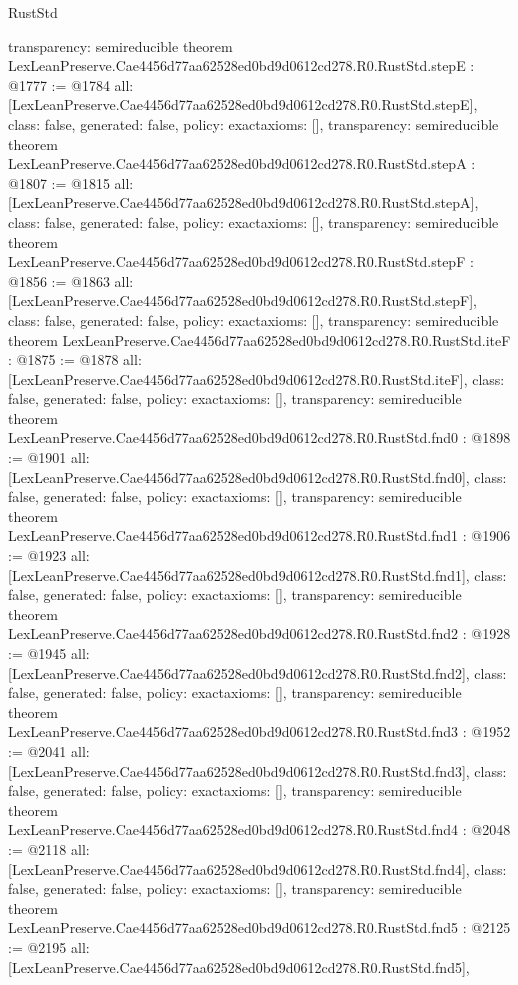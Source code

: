 \begin{lexlean}{RustStd}
\begin{coremodule}
{  transparency: semireducible
}
theorem LexLeanPreserve.Cae4456d77aa62528ed0bd9d0612cd278.R0.RustStd.stepE : @1777 := @1784 {
  all: [LexLeanPreserve.Cae4456d77aa62528ed0bd9d0612cd278.R0.RustStd.stepE],
  class: false,
  generated: false,
  policy: exact{axioms: []},
  transparency: semireducible
}
theorem LexLeanPreserve.Cae4456d77aa62528ed0bd9d0612cd278.R0.RustStd.stepA : @1807 := @1815 {
  all: [LexLeanPreserve.Cae4456d77aa62528ed0bd9d0612cd278.R0.RustStd.stepA],
  class: false,
  generated: false,
  policy: exact{axioms: []},
  transparency: semireducible
}
theorem LexLeanPreserve.Cae4456d77aa62528ed0bd9d0612cd278.R0.RustStd.stepF : @1856 := @1863 {
  all: [LexLeanPreserve.Cae4456d77aa62528ed0bd9d0612cd278.R0.RustStd.stepF],
  class: false,
  generated: false,
  policy: exact{axioms: []},
  transparency: semireducible
}
theorem LexLeanPreserve.Cae4456d77aa62528ed0bd9d0612cd278.R0.RustStd.iteF : @1875 := @1878 {
  all: [LexLeanPreserve.Cae4456d77aa62528ed0bd9d0612cd278.R0.RustStd.iteF],
  class: false,
  generated: false,
  policy: exact{axioms: []},
  transparency: semireducible
}
theorem LexLeanPreserve.Cae4456d77aa62528ed0bd9d0612cd278.R0.RustStd.fnd0 : @1898 := @1901 {
  all: [LexLeanPreserve.Cae4456d77aa62528ed0bd9d0612cd278.R0.RustStd.fnd0],
  class: false,
  generated: false,
  policy: exact{axioms: []},
  transparency: semireducible
}
theorem LexLeanPreserve.Cae4456d77aa62528ed0bd9d0612cd278.R0.RustStd.fnd1 : @1906 := @1923 {
  all: [LexLeanPreserve.Cae4456d77aa62528ed0bd9d0612cd278.R0.RustStd.fnd1],
  class: false,
  generated: false,
  policy: exact{axioms: []},
  transparency: semireducible
}
theorem LexLeanPreserve.Cae4456d77aa62528ed0bd9d0612cd278.R0.RustStd.fnd2 : @1928 := @1945 {
  all: [LexLeanPreserve.Cae4456d77aa62528ed0bd9d0612cd278.R0.RustStd.fnd2],
  class: false,
  generated: false,
  policy: exact{axioms: []},
  transparency: semireducible
}
theorem LexLeanPreserve.Cae4456d77aa62528ed0bd9d0612cd278.R0.RustStd.fnd3 : @1952 := @2041 {
  all: [LexLeanPreserve.Cae4456d77aa62528ed0bd9d0612cd278.R0.RustStd.fnd3],
  class: false,
  generated: false,
  policy: exact{axioms: []},
  transparency: semireducible
}
theorem LexLeanPreserve.Cae4456d77aa62528ed0bd9d0612cd278.R0.RustStd.fnd4 : @2048 := @2118 {
  all: [LexLeanPreserve.Cae4456d77aa62528ed0bd9d0612cd278.R0.RustStd.fnd4],
  class: false,
  generated: false,
  policy: exact{axioms: []},
  transparency: semireducible
}
theorem LexLeanPreserve.Cae4456d77aa62528ed0bd9d0612cd278.R0.RustStd.fnd5 : @2125 := @2195 {
  all: [LexLeanPreserve.Cae4456d77aa62528ed0bd9d0612cd278.R0.RustStd.fnd5],
}
\end{coremodule}
\end{lexlean}
